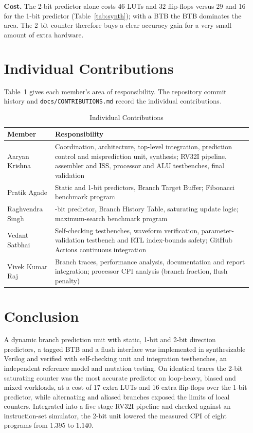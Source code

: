 \documentclass[conference]{IEEEtran}
\begin{document}
\textbf{Cost.} The 2-bit predictor alone costs 46 LUTs and 32 flip-flops versus 29 and 16 for the
1-bit predictor (Table~\ref{tab:synth}); with a BTB the BTB dominates the area. The 2-bit counter
therefore buys a clear accuracy gain for a very small amount of extra hardware.

\section{Individual Contributions}
Table~\ref{tab:contrib} gives each member's area of responsibility. The repository commit
history and \texttt{docs/CONTRIBUTIONS.md} record the individual contributions.

\begin{table}[t]
\caption{Individual Contributions}
\label{tab:contrib}
\centering
\footnotesize
\begin{tabular}{@{}>{\raggedright\arraybackslash}p{2.35cm} >{\raggedright\arraybackslash}p{5.65cm}@{}}
\toprule
Member & Responsibility \\
\midrule
Aaryan Krishna & Coordination, architecture, top-level integration, prediction control and misprediction unit, synthesis; RV32I pipeline, assembler and ISS, processor and ALU testbenches, final validation \\
Pratik Agade & Static and 1-bit predictors, Branch Target Buffer; Fibonacci benchmark program \\
Raghvendra Singh & 2-bit predictor, Branch History Table, saturating update logic; maximum-search benchmark program \\
Vedant Satbhai & Self-checking testbenches, waveform verification, parameter-validation testbench and RTL index-bounds safety; GitHub Actions continuous integration \\
Vivek Kumar Raj & Branch traces, performance analysis, documentation and report integration; processor CPI analysis (branch fraction, flush penalty) \\
\bottomrule
\end{tabular}
\end{table}

\section{Conclusion}
\label{sec:conclusion}
A dynamic branch prediction unit with static, 1-bit and 2-bit direction predictors, a tagged
BTB and a flush interface was implemented in synthesizable Verilog and verified with
self-checking unit and integration testbenches, an independent reference model and mutation
testing. On identical traces the 2-bit saturating counter was the most accurate predictor on
loop-heavy, biased and mixed workloads, at a cost of 17 extra LUTs and 16 extra flip-flops over
the 1-bit predictor, while alternating and aliased branches exposed the limits of local
counters. Integrated into a five-stage RV32I pipeline and checked against an instruction-set
simulator, the 2-bit unit lowered the measured CPI of eight programs from 1.395 to 1.140.
\end{document}
